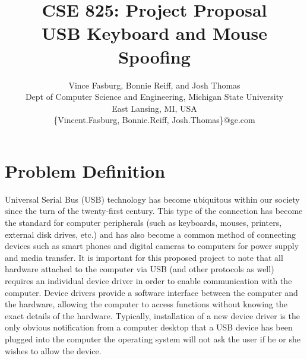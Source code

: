 \documentclass{ieee}
\begin{document}
\title{CSE 825: Project Proposal \\
USB Keyboard and Mouse Spoofing\\
}

\author{Vince Fasburg, Bonnie Reiff, and Josh Thomas\\
Dept of Computer Science and Engineering, Michigan State University\\
East Lansing, MI, USA\\
\{Vincent.Fasburg, Bonnie.Reiff, Josh.Thomas\}@ge.com\\
}

\maketitle
\thispagestyle{empty}

\section{Problem Definition}

Universal Serial Bus (USB) technology has become ubiquitous within our society since the turn of the twenty-first century. This type of the connection has become the standard for computer peripherals (such as keyboards, mouses, printers, external disk drives, etc.) and has also become a common method of connecting devices such as smart phones and digital cameras to computers for power supply and media transfer. It is important for this proposed project to note that all hardware attached to the computer via USB (and other protocols as well) requires an individual device driver in order to enable communication with the computer. Device drivers provide a software interface between the computer and the hardware, allowing the computer to access functions without knowing the exact details of the hardware. Typically, installation of a new device driver is the only obvious notification from a computer desktop that a USB device has been plugged into the computer \textemdash{} the operating system will not ask the user if he or she wishes to allow the device.
\end{document}
